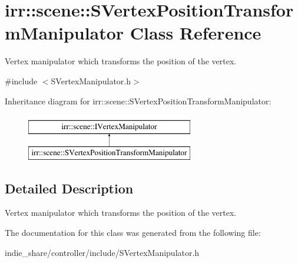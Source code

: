 \hypertarget{classirr_1_1scene_1_1SVertexPositionTransformManipulator}{}\section{irr\+:\+:scene\+:\+:S\+Vertex\+Position\+Transform\+Manipulator Class Reference}
\label{classirr_1_1scene_1_1SVertexPositionTransformManipulator}


Vertex manipulator which transforms the position of the vertex.  




{\ttfamily \#include $<$S\+Vertex\+Manipulator.\+h$>$}

Inheritance diagram for irr\+:\+:scene\+:\+:S\+Vertex\+Position\+Transform\+Manipulator\+:\begin{figure}[H]
\begin{center}
\leavevmode
\includegraphics[height=2.000000cm]{classirr_1_1scene_1_1SVertexPositionTransformManipulator}
\end{center}
\end{figure}


\subsection{Detailed Description}
Vertex manipulator which transforms the position of the vertex. 

The documentation for this class was generated from the following file\+:\begin{DoxyCompactItemize}
\item 
indie\+\_\+share/controller/include/S\+Vertex\+Manipulator.\+h\end{DoxyCompactItemize}
